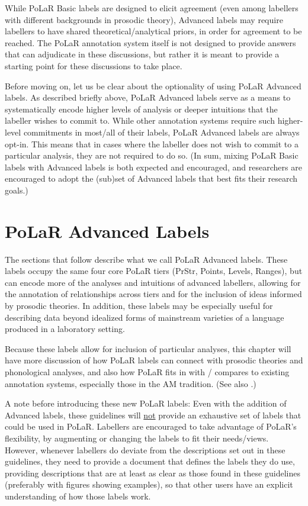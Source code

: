 \documentclass[11pt, twoside]{memoir}
\begin{document}
While PoLaR Basic labels are designed to elicit agreement (even among labellers with different backgrounds in prosodic theory), Advanced labels may require labellers to have shared theoretical\slash analytical priors, in order for agreement to be reached. The PoLaR annotation system itself is not designed to provide answers that can adjudicate in these discussions, but rather it is meant to provide a starting point for these discussions to take place.

Before moving on, let us be clear about the optionality of using PoLaR Advanced labels. As described briefly above, PoLaR Advanced labels serve as a means to systematically encode higher levels of analysis or deeper intuitions that the labeller wishes to commit to. While other annotation systems require such higher-level commitments in most\slash all of their labels, PoLaR Advanced labels are always opt-in. This means that in cases where the labeller does not wish to commit to a particular analysis, they are not required to do so. (In sum, mixing PoLaR Basic labels with Advanced labels is both expected and encouraged, and researchers are encouraged to adopt the (sub)set of Advanced labels that best fits their research goals.)

\section{PoLaR Advanced Labels}\label{sec:polar-advanced-labels}

The sections that follow describe what we call PoLaR Advanced labels. These labels occupy the same four core PoLaR tiers (PrStr, Points, Levels, Ranges), but can encode more of the analyses and intuitions of advanced labellers, allowing for the annotation of relationships across tiers and for the inclusion of ideas informed by prosodic theories. In addition, these labels may be especially useful for describing data beyond idealized forms of mainstream varieties of a language produced in a laboratory setting.

Because these labels allow for inclusion of particular analyses, this chapter will have more discussion of how PoLaR labels can connect with prosodic theories and phonological analyses, and also how PoLaR fits in with / compares to existing annotation systems, especially those in the AM tradition. (See also \citealt{ahn-19}.)

A note before introducing these new PoLaR labels: Even with the addition of Advanced labels, these guidelines will \uline{not} provide an exhaustive set of labels that could be used in PoLaR. Labellers are encouraged to take advantage of PoLaR’s flexibility, by augmenting or changing the labels to fit their needs\slash views. However, whenever labellers do deviate from the descriptions set out in these guidelines, they need to provide a document that defines the labels they do use, providing descriptions that are at least as clear as those found in these guidelines (preferably with figures showing examples), so that other users have an explicit understanding of how those labels work.
\end{document}
